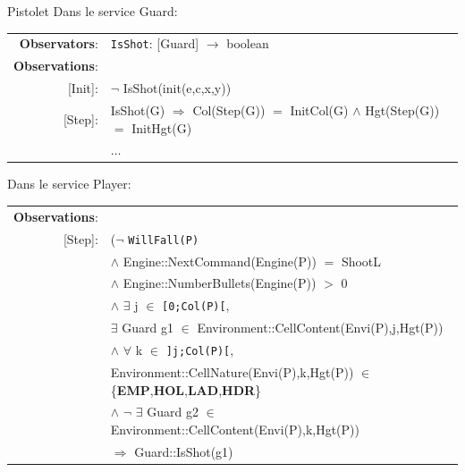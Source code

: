\documentclass[aspectratio=169]{beamer}
\begin{document}
\begin{frame}{Pistolet}
  Dans le service \textrm{Guard}:
  \begin{longtable}{rl}
    \textbf{Observators}:& \texttt{IsShot}: \textrm{[Guard]} $\rightarrow$ \textrm{boolean} \\
    \textbf{Observations}:&\\
    \textrm{[Init]}: & $\neg$ \textrm{IsShot(init(e,c,x,y))} \\
    \textrm{[Step]}: & \textrm{IsShot(G)} $\Rightarrow$ \textrm{Col(Step(G))} $=$ \textrm{InitCol(G)} $\land$ \textrm{Hgt(Step(G))} $=$ \textrm{InitHgt(G)} \\
    & $\ldots$
  \end{longtable}

  Dans le service \textrm{Player}:
  \begin{longtable}{rl}
    \textbf{Observations}:&\\
    \textrm{[Step]}: & ($\neg$ \texttt{WillFall(P)} \\
    & \quad\quad $\land$ \textrm{Engine::NextCommand(Engine(P))} $=$ ShootL \\
    & \quad\quad $\land$ \textrm{Engine::NumberBullets(Engine(P))} $>$ 0 \\
    & \quad\quad $\land$ $\exists$ j $\in$ \texttt{[0;Col(P)[},\\
    & \quad\quad\quad\quad $\exists$ Guard g1 $\in$ \textrm{Environment::CellContent(Envi(P),j,Hgt(P))}\\
    & \quad\quad\quad\quad $\land$ $\forall$ k $\in$ \texttt{]j;Col(P)[},\\
    & \quad\quad\quad\quad\quad\quad \textrm{Environment::CellNature(Envi(P),k,Hgt(P))} $\in$ \{\textbf{EMP},\textbf{HOL},\textbf{LAD},\textbf{HDR}\}\\
    & \quad\quad\quad\quad\quad\quad $\land$ $\neg$ $\exists$ Guard g2 $\in$ \textrm{Environment::CellContent(Envi(P),k,Hgt(P))}\\
    & \quad\quad $\Rightarrow$ \textrm{Guard::IsShot(g1)}
  \end{longtable}
\end{frame}
\end{document}

